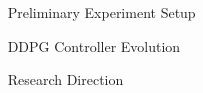 \documentclass[final]{beamer}
\newlength{\sepwid}
\newlength{\onecolwid}
\newlength{\twocolwid}
\begin{document}
\begin{frame}[t]
\begin{columns}[t]
\begin{column}[t]{\twocolwid}
\begin{columns}[t,totalwidth=\twocolwid]
\begin{column}{\onecolwid}

\end{column} %

\end{columns} %

\end{column} %

\begin{column}{\sepwid}\end{column} %

\begin{column}{\onecolwid} %


\begin{block}{Preliminary Experiment Setup}


\end{block}

\begin{block}{DDPG Controller Evolution}


\end{block}

\begin{block}{Research Direction}


\end{block}


\end{column} %

\end{columns} %

\end{frame} %
\end{document}
